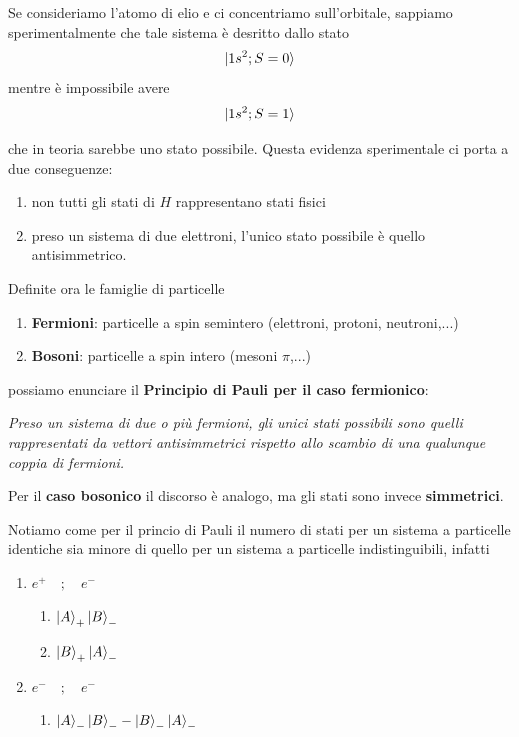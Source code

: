 Se consideriamo l'atomo di elio e ci concentriamo sull'orbitale, sappiamo sperimentalmente che tale sistema è desritto dallo stato
\begin{align}
\ket{1s^2;S=0}
\end{align}
mentre è impossibile avere
\begin{align}
\ket{1s^2;S=1}
\end{align}

che in teoria sarebbe uno stato possibile. Questa evidenza sperimentale ci porta a due conseguenze:

\begin{enumerate}
	\item non tutti gli stati di $H$ rappresentano stati fisici 
	\item preso un sistema di due elettroni, l'unico stato possibile è quello antisimmetrico.
\end{enumerate}

Definite ora le famiglie di particelle

\begin{enumerate}
	\item \textbf{Fermioni}: particelle a spin semintero (elettroni, protoni, neutroni,...)
	\item \textbf{Bosoni}: particelle a spin intero (mesoni $\pi$,...)
\end{enumerate}

possiamo enunciare il \textbf{Principio di Pauli per il caso fermionico}:

\textit{Preso un sistema di due o più fermioni, gli unici stati possibili sono quelli rappresentati da vettori antisimmetrici rispetto allo scambio di una qualunque coppia di fermioni.}

Per il \textbf{caso bosonico} il discorso è analogo, ma gli stati sono invece \textbf{simmetrici}.

\newpage

Notiamo come per il princio di Pauli il numero di stati per un sistema a particelle identiche sia minore di quello per un sistema a particelle indistinguibili, infatti

\begin{enumerate}
	\item $e^+ \quad;\quad e^-$
	\begin{enumerate}
		\item $\ket{A}_+ \ket{B}_-$
		\item $\ket{B}_+ \ket{A}_-$
	\end{enumerate}
	
	\item $e^- \quad;\quad e^-$
	\begin{enumerate}
		\item $\ket{A}_-\ket{B}_- - \ket{B}_-\ket{A}_-$
	\end{enumerate}
\end{enumerate}

